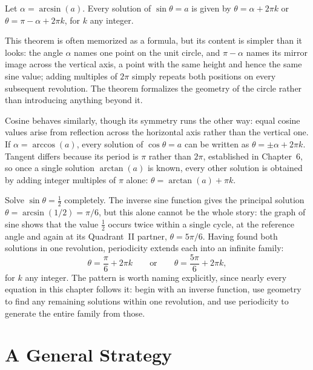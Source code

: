 \begin{theorem}
Let $\alpha = \arcsin(a)$. Every solution of $\sin\theta = a$ is given by
$\theta = \alpha + 2\pi k$ or $\theta = \pi - \alpha + 2\pi k$, for $k$ any
integer.
\end{theorem}

This theorem is often memorized as a formula, but its content is simpler
than it looks: the angle $\alpha$ names one point on the unit circle, and
$\pi - \alpha$ names its mirror image across the vertical axis, a point
with the same height and hence the same sine value; adding multiples of
$2\pi$ simply repeats both positions on every subsequent revolution. The
theorem formalizes the geometry of the circle rather than introducing
anything beyond it.

Cosine behaves similarly, though its symmetry runs the other way: equal
cosine values arise from reflection across the horizontal axis rather than
the vertical one. If $\alpha = \arccos(a)$, every solution of $\cos\theta =
a$ can be written as $\theta = \pm\alpha + 2\pi k$. Tangent differs because
its period is $\pi$ rather than $2\pi$, established in Chapter~6, so once a
single solution $\arctan(a)$ is known, every other solution is obtained by
adding integer multiples of $\pi$ alone: $\theta = \arctan(a) + \pi k$.

\begin{example}
Solve $\sin\theta = \tfrac12$ completely. The inverse sine function gives
the principal solution $\theta = \arcsin(1/2) = \pi/6$, but this alone
cannot be the whole story: the graph of sine shows that the value
$\tfrac12$ occurs twice within a single cycle, at the reference angle and
again at its Quadrant~II partner, $\theta = 5\pi/6$. Having found both
solutions in one revolution, periodicity extends each into an infinite
family:
\[
\theta = \frac{\pi}{6} + 2\pi k \qquad \text{or} \qquad \theta = \frac{5\pi}{6} + 2\pi k,
\]
for $k$ any integer. The pattern is worth naming explicitly, since nearly
every equation in this chapter follows it: begin with an inverse function,
use geometry to find any remaining solutions within one revolution, and use
periodicity to generate the entire family from those.
\end{example}

\section{A General Strategy}

